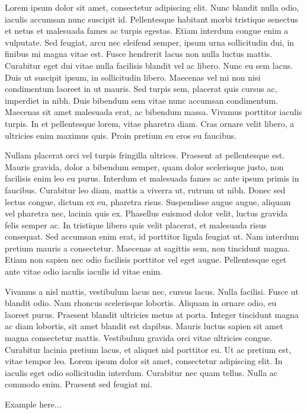 \documentclass[fontsize=12pt,a4paper]{scrreprt}
\begin{document}
Lorem ipsum dolor sit amet, consectetur adipiscing elit. Nunc blandit nulla odio, iaculis accumsan nunc suscipit id. Pellentesque habitant morbi tristique senectus et netus et malesuada fames ac turpis egestas. Etiam interdum congue enim a vulputate. Sed feugiat, arcu nec eleifend semper, ipsum urna sollicitudin dui, in finibus mi magna vitae est. Fusce hendrerit lacus non nulla luctus mattis. Curabitur eget dui vitae nulla facilisis blandit vel ac libero. Nunc eu sem lacus. Duis ut suscipit ipsum, in sollicitudin libero. Maecenas vel mi non nisi condimentum laoreet in ut mauris. Sed turpis sem, placerat quis cursus ac, imperdiet in nibh. Duis bibendum sem vitae nunc accumsan condimentum. Maecenas sit amet malesuada erat, ac bibendum massa. Vivamus porttitor iaculis turpis. In et pellentesque lorem, vitae pharetra diam. Cras ornare velit libero, a ultricies enim maximus quis. Proin pretium eu eros eu faucibus.

Nullam placerat orci vel turpis fringilla ultrices. Praesent at pellentesque est. Mauris gravida, dolor a bibendum semper, quam dolor scelerisque justo, non facilisis enim leo eu purus. Interdum et malesuada fames ac ante ipsum primis in faucibus. Curabitur leo diam, mattis a viverra ut, rutrum ut nibh. Donec sed lectus congue, dictum ex eu, pharetra risus. Suspendisse augue augue, aliquam vel pharetra nec, lacinia quis ex. Phasellus euismod dolor velit, luctus gravida felis semper ac. In tristique libero quis velit placerat, et malesuada risus consequat. Sed accumsan enim erat, id porttitor ligula feugiat ut. Nam interdum pretium mauris a consectetur. Maecenas at sagittis sem, non tincidunt magna. Etiam non sapien nec odio facilisis porttitor vel eget augue. Pellentesque eget ante vitae odio iaculis iaculis id vitae enim.

Vivamus a nisl mattis, vestibulum lacus nec, cursus lacus. Nulla facilisi. Fusce ut blandit odio. Nam rhoncus scelerisque lobortis. Aliquam in ornare odio, eu laoreet purus. Praesent blandit ultricies metus at porta. Integer tincidunt magna ac diam lobortis, sit amet blandit est dapibus. Mauris luctus sapien sit amet magna consectetur mattis. Vestibulum gravida orci vitae ultricies congue. Curabitur lacinia pretium lacus, et aliquet nisl porttitor eu. Ut ac pretium est, vitae tempor leo. Lorem ipsum dolor sit amet, consectetur adipiscing elit. In iaculis eget odio sollicitudin interdum. Curabitur nec quam tellus. Nulla ac commodo enim. Praesent sed feugiat mi.

Example here...
\end{document}
